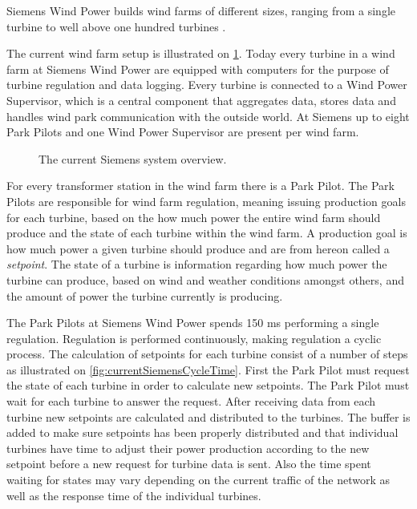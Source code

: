 
\label{sec:SiemensCase}
Siemens Wind Power builds wind farms of different sizes, ranging from a single turbine to well above one hundred turbines \cite{simensOffShoreProjects, simensOnShoreProjects}. 

The current wind farm setup is illustrated on \cref{fig:currentSiemensSetup}. Today every turbine in a wind farm at Siemens Wind Power are equipped with computers for the purpose of turbine regulation and data logging. Every turbine is connected to a Wind Power Supervisor, which is a central component that aggregates data, stores data and handles wind park communication with the outside world. At Siemens up to eight Park Pilots and one Wind Power Supervisor are present per wind farm.

\begin{figure}[!h]
	\centering
	\scalebox{0.7}{}
	\caption[The current Siemens wind farm system overview]{
		\label{fig:currentSiemensSetup} 
		\footnotesize{%
			The current Siemens system overview.
		}
	}
\end{figure}

For every transformer station in the wind farm there is a Park Pilot. The Park Pilots are responsible for wind farm regulation, meaning issuing production goals for each turbine, based on the how much power the entire wind farm should produce and the state of each turbine within the wind farm. A production goal is how much power a given turbine should produce and are from hereon called a \textit{setpoint}. The state of a turbine is information regarding how much power the turbine can produce, based on wind and weather conditions amongst others, and the amount of power the turbine currently is producing. 

The Park Pilots at Siemens Wind Power spends 150 ms performing a single regulation. Regulation is performed continuously, making regulation a cyclic process. The calculation of setpoints for each turbine consist of a number of steps as illustrated on \cref{fig:currentSiemensCycleTime}. First the Park Pilot must request the state of each turbine in order to calculate new setpoints. The Park Pilot must wait for each turbine to answer the request. After receiving data from each turbine new setpoints are calculated and distributed to the turbines. The buffer is added to make sure setpoints has been properly distributed and that individual turbines have time to adjust their power production according to the new setpoint before a new request for turbine data is sent. Also the time spent waiting for states may vary depending on the current traffic of the network as well as the response time of the individual turbines.

